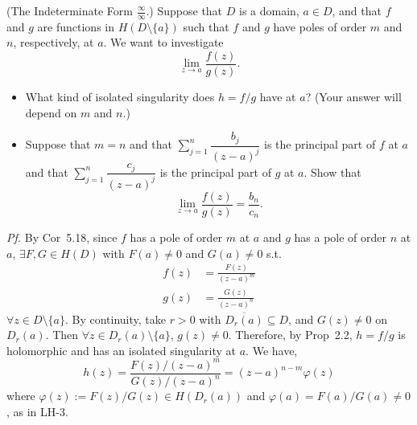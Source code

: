 \documentclass[a4paper]{article}
\begin{document}
\begin{tcolorbox}[colback=gray!10, colframe=black, boxrule=0.5pt, arc=2mm]
(The Indeterminate Form $\frac{\infty}{\infty}$.) Suppose that $D$ is a domain, $a \in D$, and that $f$ and $g$ are functions in $H(D \setminus \{a\})$ such that $f$ and $g$ have poles of order $m$ and $n$, respectively, at $a$. We want to investigate
\[
\lim_{z \to a} \frac{f(z)}{g(z)}.
\]
\begin{itemize}
\item[\textbf{(a)}] What kind of isolated singularity does $h = f/g$ have at $a$? (Your answer will depend on $m$ and $n$.)
\item[\textbf{(b)}] Suppose that $m = n$ and that $\sum_{j=1}^{n} \dfrac{b_j}{(z-a)^j}$ is the principal part of $f$ at $a$ and that $\sum_{j=1}^{n} \dfrac{c_j}{(z-a)^j}$ is the principal part of $g$ at $a$. Show that
\[
\lim_{z \to a} \frac{f(z)}{g(z)} = \frac{b_n}{c_n}.
\]
\end{itemize}
\end{tcolorbox}

\textit{Pf.} By Cor~5.18, since $f$ has a pole of order $m$ at $a$ and $g$ has a pole of order $n$ at $a$, $\exists F, G \in H(D)$ with $F(a) \neq 0$ and $G(a) \neq 0$ s.t.
\begin{align*}
f(z) &= \frac{F(z)}{(z-a)^m} \\
g(z) &= \frac{G(z)}{(z-a)^n}
\end{align*}
$\forall z \in D \setminus \{a\}$. By continuity, take $r > 0$ with $\overline{D_r(a)} \subseteq D$, and $G(z) \neq 0$ on $D_r(a)$. Then $\forall z \in D_r(a) \setminus \{a\}$, $g(z) \neq 0$. Therefore, by Prop~2.2, $h = f/g$ is holomorphic and has an isolated singularity at $a$. We have,
\[
h(z) = \frac{F(z)/(z-a)^m}{G(z)/(z-a)^n} = (z-a)^{n-m}\varphi(z)
\]
where $\varphi(z) := F(z)/G(z) \in H(D_r(a))$ and $\varphi(a) = F(a)/G(a) \neq 0$, as in LH-3.
\end{document}
